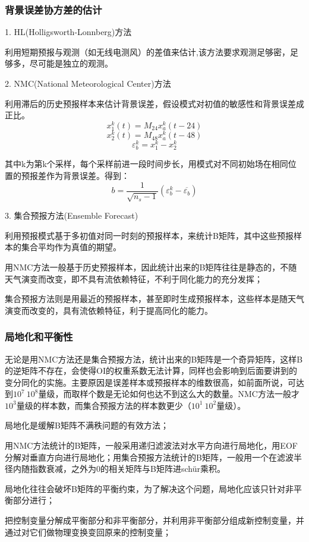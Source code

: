 \documentclass{article}
\begin{document}
\subsubsection{背景误差协方差的估计}
1. HL(Holligsworth-Lonnberg)方法

利用短期预报与观测（如无线电测风）的差值来估计,该方法要求观测足够密，足够多，尽可能是独立的观测。

2. NMC(National Meteorological Center)方法

利用滞后的历史预报样本来估计背景误差，假设模式对初值的敏感性和背景误差成正比。
$$x_1^k(t) = M_{24}x_a^{k}(t-24)$$
$$x_2^k(t) = M_{48}x_a^{k}(t-48)$$
$$\varepsilon_b^{k} = x_1^k - x_2^k$$

其中k为第k个采样，每个采样前进一段时间步长，用模式对不同初始场在相同位置的预报差作为背景误差。得到：
$$b = \frac{1}{\sqrt{n_s - 1}}(\varepsilon^k_b - \overline{\varepsilon_b})$$


3. 集合预报方法(Ensemble Forecast)

利用预报模式基于多初值对同一时刻的预报样本，来统计B矩阵，其中这些预报样本的集合平均作为真值的期望。

用NMC方法一般基于历史预报样本，因此统计出来的B矩阵往往是静态的，不随天气演变而改变，即不具有流依赖特征，不利于同化能力的充分发挥；

集合预报方法则是用最近的预报样本，甚至即时生成预报样本，这些样本是随天气演变而改变的，具有流依赖特征，利于提高同化的能力。

\subsubsection{局地化和平衡性}
无论是用NMC方法还是集合预报方法，统计出来的B矩阵是一个奇异矩阵，这样B的逆矩阵不存在，会使得OI的权重系数无法计算，同样也会影响到后面要讲到的变分同化的实施。主要原因是误差样本或预报样本的维数很高，如前面所说，可达到$10^7~10^8$量级，而取样个数是无论如何也达不到这么大的数量。NMC方法一般才$10^3$量级的样本数，而集合预报方法的样本数更少（$10^1~10^2$量级）。

局地化是缓解B矩阵不满秩问题的有效方法；

用NMC方法统计的B矩阵，一般采用递归滤波法对水平方向进行局地化，用EOF分解对垂直方向进行局地化；用集合预报方法统计的B矩阵，一般用一个在滤波半径内随指数衰减，之外为0的相关矩阵与B矩阵进schür乘积。

局地化往往会破坏B矩阵的平衡约束，为了解决这个问题，局地化应该只针对非平衡部分进行；

把控制变量分解成平衡部分和非平衡部分，并利用非平衡部分组成新控制变量，并通过对它们做物理变换变回原来的控制变量；
\end{document}
